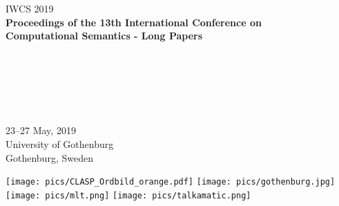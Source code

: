 \documentclass[a4paper,11pt,oneside]{book}
\begin{document}
\thispagestyle{empty}

\begin{center}
  \LARGE IWCS 2019 \\
  \vspace*{55mm}
    {\bf
    \LARGE
    Proceedings of the 13th International Conference on \\ Computational Semantics - Long Papers\\
    \hspace*{1cm}\\ \hspace*{1cm} \\
    \hspace*{1cm} \\ \hspace*{1cm}\\
    \hspace*{1cm}\\
    \vspace{2cm}
    \LARGE
    \vspace{2cm}
    \hspace*{1cm}} \\ %
    \vspace{43mm}
    \LARGE
    23--27 May, 2019\\
    University of Gothenburg \\
    Gothenburg, Sweden
  \end{center}

\clearpage

\thispagestyle{empty}

%
\texttt{[image: pics/CLASP\_Ordbild\_orange.pdf]} \quad \texttt{[image: pics/gothenburg.jpg]} \quad \texttt{[image: pics/mlt.png]}  \quad \texttt{[image: pics/talkamatic.png]} 
\end{document}
